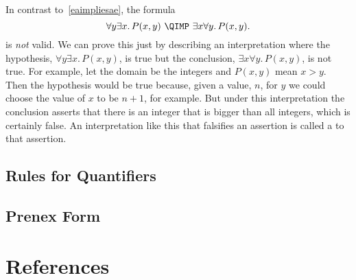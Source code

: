 \iffalse So this wasn't a proof, just an explanation intended to make
clear what~\eqref{eaimpliesae} means.\fi

In contrast to~\eqref{eaimpliesae}, the formula
\begin{equation}\label{aenotimplyea}
\forall y \exists x.\, P(x,y)\ \QIMP\ \exists x \forall y.\, P(x,y).
\end{equation}
is \emph{not} valid.  We can prove this just by describing an
interpretation where the hypothesis, $\forall y \exists x.\, P(x,y)$, is
true but the conclusion, $\exists x \forall y.\, P(x,y)$, is not true.
For example, let the domain be the integers and $P(x,y)$ mean $x > y$.
Then the hypothesis would be true because, given a value, $n$, for $y$ we
could choose the value of $x$ to be $n+1$, for example.  But under this
interpretation the conclusion asserts that there is an integer that is
bigger than all integers, which is certainly false.  An interpretation
like this that falsifies an assertion is called a  to
that assertion.

\begin{problems}

\practiceproblems
{}

\classproblems
{}

\homeworkproblems
{}

\examproblems
{}
\end{problems}

\begin{editingnotes}
\section{Rules for Quantifiers}

\subsection{Prenex Form}

\end{editingnotes}

\section{References}

 \cite{GareyJohnson}

\endinput
